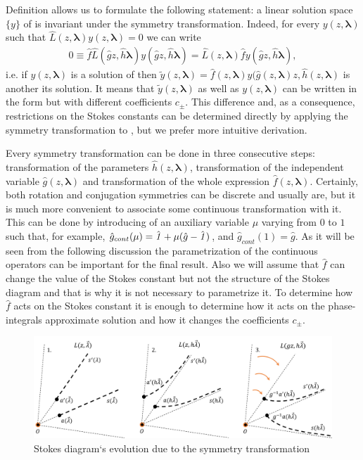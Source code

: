 \documentclass[12pt]{iopart}
\def\f{\hat{f}}
\def\g{\hat{g}}
\def\h{\hat{h}}
\def\L{\widehat{L}}
\def\lmbd{\bm{\lambda}}
\def\unity{\hat{\it 1}}
\begin{document}
Definition  allows us to formulate the following statement: a linear solution space $\{y\}$ 
of  is invariant under the symmetry transformation. Indeed, for every $y(z,\lmbd)$
such that $\L(z,\lmbd)y(z,\lmbd)=0$ we can write
\begin{eqnarray}
0 \equiv \f\L(\g z,\h \lmbd)y(\g z,\h \lmbd)=
\L(z,\lmbd)\f y(\g z,\h \lmbd),   \label{eq:invrnt}
\end{eqnarray}
i.e. if $y(z,\lmbd)$ is a solution of  
then $\tilde{y}(z,\lmbd)=\f(z,\lmbd)y(\g(z,\lmbd)z,\h(z,\lmbd)$ is another its solution.
It means that $\tilde{y}(z,\lmbd)$ as well as $y(z,\lmbd)$ can be written in the form 
but with different coefficients $c_\pm$. This difference and, as a consequence, 
restrictions on the Stokes constants can be determined directly by applying
the symmetry transformation to , but we prefer more intuitive derivation.

Every symmetry transformation can be done in three consecutive steps: transformation 
of the parameters $\h(z,\lmbd)$, transformation of the independent variable $\g(z,\lmbd)$ and 
transformation of the whole expression $\f(z,\lmbd)$. 
Certainly, both rotation and conjugation symmetries can be discrete and 
usually are, but it is much more convenient to associate some continuous transformation 
with it. This can be done by introducing of an auxiliary variable $\mu$ varying from $0$ 
to $1$ such that, for example, $\g_{cont}(\mu)=\unity+\mu (\g-\unity)$, and $\g_{cont}(1)=\g$. 
As it will be seen from the following discussion the parametrization of the 
continuous operators can be important for the final result. Also we will assume that $\f$ can 
change the value of the Stokes constant but not the structure of the Stokes diagram and 
that is why it is not necessary to parametrize it. To determine how $\f$ acts on the 
Stokes constant it is enough to determine how it acts on the phase-integrals approximate 
solution  and how it changes the coefficients $c_\pm$.

\begin{figure}
\centering
\noindent
\includegraphics[scale=.5]{stuff/rs.png}
\caption{Stokes diagram`s evolution due to the symmetry transformation}
\label{fig:rst}
\end{figure}
\end{document}
